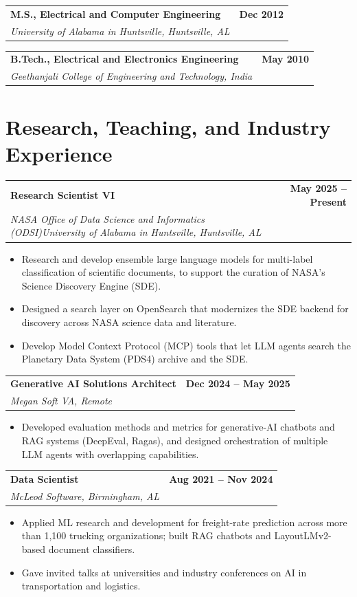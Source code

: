 \documentclass[11pt,letterpaper]{article}
\makeatletter
\newcommand{\cventry}[3]{%
  \par\needspace{5\baselineskip}\vspace{0.6ex}%
  \noindent\begin{tabularx}{\textwidth}{@{}X r@{}}
    \textbf{#1} & \textbf{#3}\\
    \textit{#2} & \\
  \end{tabularx}%
  \vspace{-0.4ex}%
}
\makeatother
\begin{document}
\cventry{M.S., Electrical and Computer Engineering}{University of Alabama in Huntsville, Huntsville, AL}{Dec 2012}

\cventry{B.Tech., Electrical and Electronics Engineering}{Geethanjali College of Engineering and Technology, India}{May 2010}

\section{Research, Teaching, and Industry Experience}

\cventry{Research Scientist VI}{NASA Office of Data Science and Informatics (ODSI)\newline University of Alabama in Huntsville, Huntsville, AL}{May 2025 -- Present}
\begin{itemize}
  \item Research and develop ensemble large language models for multi-label classification of scientific documents, to support the curation of NASA's Science Discovery Engine (SDE).
  \item Designed a search layer on OpenSearch that modernizes the SDE backend for discovery across NASA science data and literature.
  \item Develop Model Context Protocol (MCP) tools that let LLM agents search the Planetary Data System (PDS4) archive and the SDE.
\end{itemize}

\cventry{Generative AI Solutions Architect}{Megan Soft VA, Remote}{Dec 2024 -- May 2025}
\begin{itemize}
  \item Developed evaluation methods and metrics for generative-AI chatbots and RAG systems (DeepEval, Ragas), and designed orchestration of multiple LLM agents with overlapping capabilities.
\end{itemize}

\cventry{Data Scientist}{McLeod Software, Birmingham, AL}{Aug 2021 -- Nov 2024}
\begin{itemize}
  \item Applied ML research and development for freight-rate prediction across more than 1,100 trucking organizations; built RAG chatbots and LayoutLMv2-based document classifiers.
  \item Gave invited talks at universities and industry conferences on AI in transportation and logistics.
\end{itemize}
\end{document}
